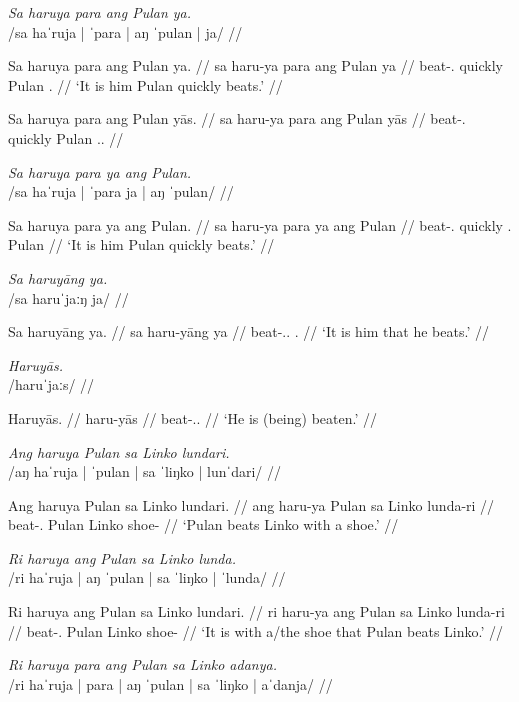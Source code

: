 \documentclass[12pt,a4paper]{scrartcl}
\newcommand{\TsgM}{{\Tsg}.{\M}}
\begin{document}
\pex
\a\begingl
\glpreamble \textit{Sa haruya para ang Pulan ya.} \\
	/sa haˈruja | ˈpara | aŋ ˈpulan | ja/ //

\gla Sa haruya para ang Pulan ya. //
\glb sa haru-ya para ang Pulan ya //
\glc \PatT{} beat-\TsgM{} quickly \Aarg{} Pulan \TsgM{} //
\glft `It is him Pulan quickly beats.' //
\endgl

\a\ljudge*\begingl
\gla Sa haruya para ang Pulan yās. //
\glb sa haru-ya para ang Pulan yās //
\glc \PatT{} beat-\TsgM{} quickly \Aarg{} Pulan \TsgM{}.\Parg{} //
\endgl\xe

\ex\begingl
\glpreamble \textit{Sa haruya para ya ang Pulan.}\\
	/sa haˈruja | ˈpara ja | aŋ ˈpulan/ //

\gla Sa haruya para ya ang Pulan. //
\glb sa haru-ya para ya ang Pulan //
\glc \PatT{} beat-\TsgM{} quickly \TsgM{} \Aarg{} Pulan //
\glft `It is him Pulan quickly beats.' //
\endgl\xe

\ex\begingl
\glpreamble \textit{Sa haruyāng ya.}\\
	/sa haruˈjaːŋ ja/ //

\gla Sa haruyāng ya. //
\glb sa haru-yāng ya //
\glc \PatT{} beat-\TsgM{}.\Aarg{} \TsgM{} //
\glft `It is him that he beats.' //
\endgl\xe

\ex\begingl
\glpreamble \textit{Haruyās.}\\
	/haruˈjaːs/ //

\gla Haruyās. //
\glb haru-yās //
\glc beat-\TsgM{}.\Parg{} //
\glft `He is (being) beaten.' //
\endgl\xe

\ex\begingl
\glpreamble \textit{Ang haruya Pulan sa Linko lundari.}\\
	/aŋ haˈruja | ˈpulan | sa ˈliŋko | lunˈdari/ //

\gla Ang haruya Pulan sa Linko lundari. //
\glb ang haru-ya Pulan sa Linko lunda-ri //
\glc \AgtT{} beat-\TsgM{} Pulan \Parg{} Linko shoe-\Ins{} //
\glft `Pulan beats Linko with a shoe.' //
\endgl\xe

\ex\begingl
\glpreamble \textit{Ri haruya ang Pulan sa Linko lunda.}\\
	/ri haˈruja | aŋ ˈpulan | sa ˈliŋko | ˈlunda/ //

\gla Ri haruya ang Pulan sa Linko lundari. //
\glb ri haru-ya ang Pulan sa Linko lunda-ri //
\glc \InsT{} beat-\TsgM{} \Aarg{} Pulan \Parg{} Linko shoe-\Ins{} //
\glft `It is with a/the shoe that Pulan beats Linko.' //
\endgl\xe


\ex\begingl
\glpreamble \textit{Ri haruya para ang Pulan sa Linko adanya.}\\
	/ri haˈruja | para | aŋ ˈpulan | sa ˈliŋko | aˈdanja/ //
\end{document}
